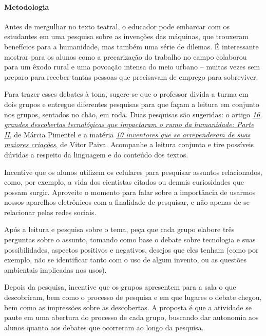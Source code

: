 \documentclass[11pt]{extarticle}
\begin{document}
\paragraph{Metodologia} Antes de mergulhar no texto teatral, o educador pode embarcar com os estudantes em uma pesquisa sobre as invenções das máquinas, que trouxeram benefícios para a humanidade, mas também uma série de dilemas. É interessante mostrar para os alunos como a precarização do trabalho no campo colaborou para um êxodo rural e uma povoação intensa do meio urbano -- muitas vezes sem preparo para receber tantas pessoas que precisavam de emprego para sobreviver. 

Para trazer esses debates à tona, sugere-se que o professor divida a turma em dois grupos e entregue diferentes pesquisas para que façam a leitura em conjunto nos grupos, sentados no chão, em roda. Duas pesquisas são sugeridas: o artigo \href{http://multirio.rio.rj.gov.br/index.php/leia/reportagens-artigos/reportagens/16755-16-grandes-descobertas-tecnol\%C3\%B3gicas-que-impactaram-o-rumo-da-humanidade-parte-ii}{\textit{16 grandes descobertas tecnológicas que impactaram o rumo da humanidade: Parte II}}, de Márcia Pimentel e a matéria \href{https://www.hypeness.com.br/2017/03/selecao-hypeness-10-inventores-que-se-arrependeram-de-suas-maiores-criacoes/}{\textit{10 inventores que se arrependeram de suas maiores criações}}, de Vitor Paiva. Acompanhe a leitura conjunta e tire possíveis dúvidas a respeito da linguagem  e do conteúdo dos textos. 

Incentive que os alunos utilizem os celulares para pesquisar assuntos relacionados, como, por exemplo, a vida dos cientistas citados ou demais curiosidades que possam surgir. Aproveite o momento para falar sobre a importância de usarmos nossos aparelhos eletrônicos com a finalidade de pesquisar, e não apenas de se relacionar pelas redes sociais. 

Após a leitura e pesquisa sobre o tema, peça que cada grupo elabore três perguntas sobre o assunto, tomando como base o debate sobre tecnologia e suas possibilidades, aspectos positivos e negativos, desejos que eles tenham (como por exemplo, não se identificar tanto com o uso de algum invento, ou as questões ambientais implicadas nos usos). 

Depois da pesquisa, incentive que os grupos apresentem para a sala o que descobriram, bem como o processo de pesquisa e em que lugares o debate chegou, bem como as impressões sobre as descobertas. A proposta é que a atividade se paute em uma abertura do processo de cada grupo, buscando dar autonomia aos alunos quanto aos debates que ocorreram ao longo da pesquisa. 
\end{document}
